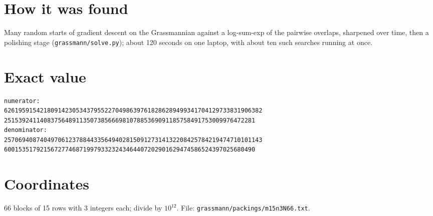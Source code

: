 \documentclass[11pt,a4paper]{article}
\begin{document}
\section{How it was found}
Many random starts of gradient descent on the Grassmannian against a log-sum-exp of the pairwise overlaps, sharpened over time, then a polishing stage (\texttt{grassmann/solve.py}); about 120 seconds on one laptop, with about ten such searches running at once.


\appendix
\section{Exact value}
{\small
\begin{verbatim}
numerator:
626195915421809142305343795522704986397618286289499341704129733831906382
2515392411408375648911350738566698107885369091185758491753009976472281
denominator:
257069408740497061237884433564940281509127314132208425784219474710101143
6001535179215672774687199793323243464407202901629474586524397025680490
\end{verbatim}}

\section{Coordinates}
66 blocks of 15 rows with 3 integers each; divide by $10^{12}$. File: \texttt{grassmann/packings/m15n3N66.txt}.
{\tiny
\begin{multicols}{3}
\end{multicols}}
\end{document}
